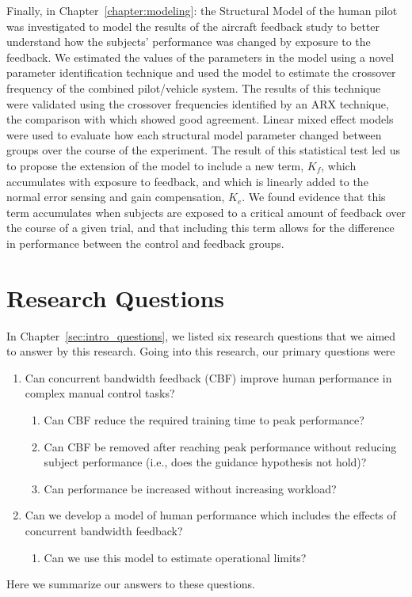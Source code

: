 Finally, in Chapter~\ref{chapter:modeling}:  the Structural Model of the human pilot was investigated to model the results of the aircraft feedback study to better understand how the subjects' performance was changed by exposure to the feedback.
We estimated the values of the parameters in the model using a novel parameter identification technique and used the model to estimate the crossover frequency of the combined pilot/vehicle system.
The results of this technique were validated using the crossover frequencies identified by an ARX technique, the comparison with which showed good agreement.
Linear mixed effect models were used to evaluate how each structural model parameter changed between groups over the course of the experiment.
The result of this statistical test led us to propose the extension of the model to include a new term, $K_f$, which accumulates with exposure to feedback, and which is linearly added to the normal error sensing and gain compensation, $K_e$.
We found evidence that this term accumulates when subjects are exposed to a critical amount of feedback over the course of a given trial, and that including this term allows for the difference in performance between the control and feedback groups.

\section{Research Questions}

In Chapter~\ref{sec:intro_questions}, we listed six research questions that we aimed to answer by this research.
Going into this research, our primary questions were
\begin{enumerate}
    \item Can concurrent bandwidth feedback (CBF) improve human performance in complex manual control tasks?
          \begin{enumerate}
              \item Can CBF reduce the required training time to peak performance?
              \item Can CBF be removed after reaching peak performance without reducing subject performance (i.e., does the guidance hypothesis not hold)?
              \item Can performance be increased without increasing workload?
          \end{enumerate}
    \item Can we develop a model of human performance which includes the effects of concurrent bandwidth feedback?
          \begin{enumerate}
              \item Can we use this model to estimate operational limits?
          \end{enumerate}
\end{enumerate}
Here we summarize our answers to these questions.

